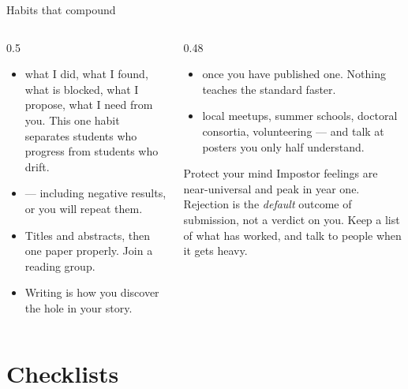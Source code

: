 \documentclass[aspectratio=169,11pt]{beamer}
\begin{document}
\begin{frame}{Habits that compound}
\begin{columns}[T]
\begin{column}{0.5\textwidth}
\footnotesize
\begin{itemize}
  \item {} what I did, what I
        found, what is blocked, what I propose, what I need from you. This one
        habit separates students who progress from students who drift.
  \item {} --- including negative results, or you will
        repeat them.
  \item {} Titles and abstracts, then one paper
        properly. Join a reading group.
  \item {} Writing is how you discover the hole in your
        story.
\end{itemize}
\end{column}
\begin{column}{0.48\textwidth}
\footnotesize
\begin{itemize}
  \item {} once you have published one. Nothing teaches the
        standard faster.
  \item {} local meetups, summer schools, doctoral consortia,
        volunteering --- and talk at posters you only half understand.
\end{itemize}
\medskip
\begin{alertblock}{Protect your mind}
\footnotesize
Impostor feelings are near-universal and peak in year one. Rejection is the
\emph{default} outcome of submission, not a verdict on you. Keep a list of what
has worked, and talk to people when it gets heavy.
\end{alertblock}
\end{column}
\end{columns}
\end{frame}

\section{Checklists}
\end{document}
